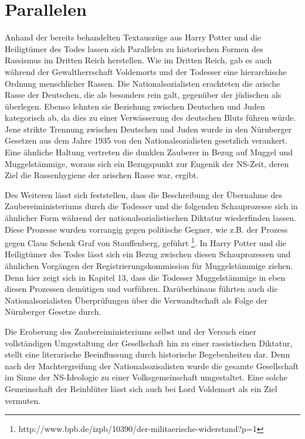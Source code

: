 \section {Parallelen}
Anhand der bereits behandelten Textauszüge aus \glqq Harry Potter und die Heiligtümer des Todes\grqq{} lassen sich Parallelen zu historischen Formen des Rassismus im Dritten Reich herstellen.
Wie im Dritten Reich, gab es auch während der Gewaltherrschaft Voldemorts und der Todesser eine hierarchische Ordnung menschlicher \glqq Rassen\grqq. 
Die Nationalsozialisten erachteten die \glqq arische\grqq{} Rasse der Deutschen, die als besonders rein galt, gegenüber der \glqq jüdischen\grqq{} als überlegen. 
Ebenso lehnten sie Beziehung zwischen Deutschen und Juden kategorisch ab, da dies zu einer Verwässerung des \glqq deutschen\grqq{} Bluts führen würde.
Jene strikte Trennung zwischen Deutschen und Juden wurde in den \glqq Nürnberger Gesetzen\grqq{} aus dem Jahre 1935 von den Nationalsozialisten gesetzlich verankert\cite[S.\,72]{MW121}.
Eine ähnliche Haltung vertreten die dunklen Zauberer in Bezug auf Muggel und Muggelstämmige, woraus sich ein Bezugspunkt zur Eugenik der NS-Zeit, deren Ziel die \glqq Rassenhygiene\grqq{} der \glqq arischen\grqq{} Rasse war, ergibt.

Des Weiteren lässt sich feststellen, dass die Beschreibung der Übernahme des Zaubereiministeriums durch die Todesser und die folgenden \glqq Schauprozesse\grqq{} sich in ähnlicher Form während der nationalsozialistischen Diktatur wiederfinden lassen.
Diese Prozesse wurden vorrangig gegen politische Gegner, wie z.B. der Prozess gegen Claus Schenk Graf von Stauffenberg, geführt \footnote{http://www.bpb.de/izpb/10390/der-militaerische-widerstand?p=1}. 
In \glqq Harry Potter und die Heiligtümer des Todes\grqq{} lässt sich ein Bezug zwischen diesen Schauprozessen und ähnlichen Vorgängen der \glqq Registrierungskommission für Muggelstämmige\grqq{} ziehen. 
Denn hier zeigt sich in Kapitel 13, dass die Todesser Muggelstämmige in eben diesen Prozessen demütigen und vorführen.
Darüberhinaus führten auch die Nationalsozialisten Überprüfungen über die Verwandtschaft als Folge der Nürnberger Gesetze durch\cite[S.\,72]{MW121}.

Die Eroberung des Zaubereiministeriums selbst und der Versuch einer  vollständigen Umgestaltung der Gesellschaft hin zu einer rassistischen Diktatur, stellt eine literarische Beeinflussung durch historische Begebenheiten dar.
Denn nach der \glqq Machtergreifung\grqq{} der Nationalsozisalisten wurde die gesamte Gesellschaft im Sinne der NS-Ideologie zu einer \glqq Volksgemeinschaft\grqq{} umgestaltet. Eine solche Gemeinschaft der Reinblüter lässt sich auch bei Lord Voldemort als ein Ziel vermuten.

